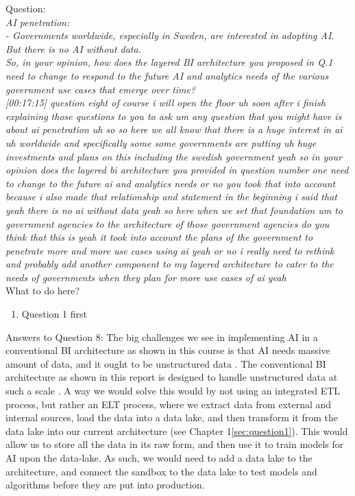 Question:\\
\emph{
    AI penetration:\\
- Governments worldwide, especially in Sweden, are interested in adopting AI.
But there is no AI without data.\\ So, in your opinion, how does the layered BI
architecture you proposed in Q.1 need to change to respond to the future AI and
analytics needs of the various government use cases that emerge over time?
}\\

\emph{[00:17:15] question eight of course i will open the floor uh soon after i
finish explaining those questions to you to ask um any question that you might have is about ai penetration
uh so so here we all know that there is a huge interest in ai uh worldwide and specifically some
some governments are putting uh huge investments and plans on this including the swedish government
yeah so in your opinion does the layered bi architecture you provided in question number
one need to change to the future ai and analytics needs or no you took that into account because i also
made that relationship and statement in the beginning i said that yeah there is no ai without data
yeah so here when we set that foundation um to government agencies to the architecture of those government
agencies do you think that this is yeah it took into account the plans of the government to penetrate
more and more use cases using ai yeah or no i really need to rethink and probably add another component
to my layered architecture to cater to the needs of governments when they plan for more use cases
of ai yeah}\\

What to do here?
\begin{enumerate}
    \item Question 1 first
  \end{enumerate}

\newpage Answers to Question 8:
The big challenges we see in implementing AI in a conventional BI architecture as shown in this course is that AI needs massive amount of data, 
and it ought to be unstructured data \cite{IBM_Structured_vs_Unstructured_Data}.
The conventional BI architecture as shown in this report is designed to handle unstructured data at such a scale \cite{Data_Lakes_Article}.
A way we would solve this would by not using an integrated ETL process, but rather an ELT process, where we extract data from external and internal sources,
load the data into a data lake, and then transform it from the data lake \cite{ETL_vs_ELT} into our current architecture (see Chapter 1\ref{sec:question1}).
This would allow us to store all the data in its raw form, and then use it to train models for AI upon the data-lake.
As such, we would need to add a data lake to the architecture, and connect the sandbox to the data lake to test models and 
algorithms before they are put into production.

